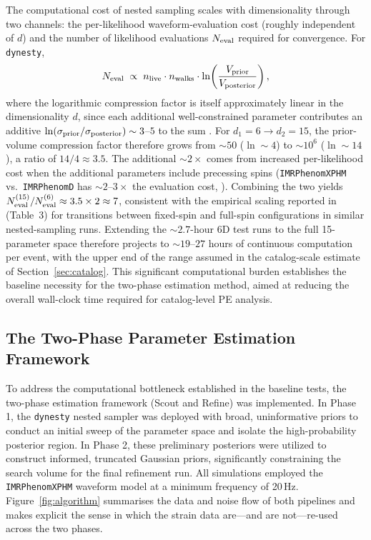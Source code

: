 \documentclass[12pt]{article}
\begin{document}
The computational cost of nested sampling scales with dimensionality through two channels: the per-likelihood waveform-evaluation cost (roughly independent of $d$) and the number of likelihood evaluations $N_{\rm eval}$ required for convergence. For \texttt{dynesty},
\begin{equation}
    N_{\rm eval} \;\propto\; n_{\rm live} \cdot n_{\rm walks} \cdot \ln\!\left(\frac{V_{\rm prior}}{V_{\rm posterior}}\right),
\end{equation}
where the logarithmic compression factor is itself approximately linear in the dimensionality $d$, since each additional well-constrained parameter contributes an additive $\ln(\sigma_{\rm prior}/\sigma_{\rm posterior})\sim 3$--$5$ to the sum \cite{Skilling2006,HigsonNS2019,Romero-Shaw2020}. For $d_1 = 6 \to d_2 = 15$, the prior-volume compression factor therefore grows from $\sim\!50$ ($\ln \sim 4$) to $\sim\!10^6$ ($\ln \sim 14$), a ratio of $14/4 \approx 3.5$. The additional $\sim 2\times$ comes from increased per-likelihood cost when the additional parameters include precessing spins (\texttt{IMRPhenomXPHM} vs.\ \texttt{IMRPhenomD} has $\sim 2$--$3\times$ the evaluation cost, \cite{Pratten2020}). Combining the two yields $N_{\rm eval}^{(15)} / N_{\rm eval}^{(6)} \approx 3.5 \times 2 \approx 7$, consistent with the empirical scaling reported in \cite{Romero-Shaw2020} (Table~3) for transitions between fixed-spin and full-spin configurations in similar nested-sampling runs. Extending the $\sim 2.7$-hour 6D test runs to the full 15-parameter space therefore projects to $\sim 19$--$27$ hours of continuous computation per event, with the upper end of the range assumed in the catalog-scale estimate of Section~\ref{sec:catalog}. This significant computational burden establishes the baseline necessity for the two-phase estimation method, aimed at reducing the overall wall-clock time required for catalog-level PE analysis.

\subsection{The Two-Phase Parameter Estimation Framework}
To address the computational bottleneck established in the baseline tests, the two-phase estimation framework (Scout and Refine) was implemented. In Phase 1, the \texttt{dynesty} nested sampler was deployed with broad, uninformative priors to conduct an initial sweep of the parameter space and isolate the high-probability posterior region. In Phase 2, these preliminary posteriors were utilized to construct informed, truncated Gaussian priors, significantly constraining the search volume for the final refinement run. All simulations employed the \texttt{IMRPhenomXPHM} waveform model at a minimum frequency of 20\,Hz. Figure~\ref{fig:algorithm} summarises the data and noise flow of both pipelines and makes explicit the sense in which the strain data are---and are not---re-used across the two phases.
\end{document}

